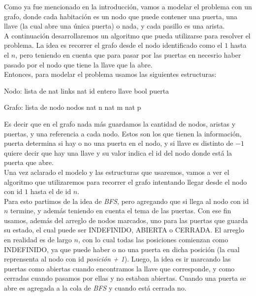 
Como ya fue mencionado en la introducción, vamos a modelar el problema con un grafo, donde cada habitación es un nodo que puede contener una puerta, una llave (la cual abre una única puerta) o nada, y cada pasillo es una arista. \\

A continuación desarrollaremos un algoritmo que pueda utilizarse para resolver el problema. La idea es recorrer el grafo desde el nodo identificado como el $1$ hasta el $n$, pero teniendo en cuenta que para pasar por las puertas en necesrio haber pasado por el nodo que tiene la llave que la abre. \\

Entonces, para modelar el problema usamos las siguientes estructuras:

\begin{verbatimtab}
Nodo:
	lista de nat links
	nat id
	entero llave
	bool puerta
\end{verbatimtab}

\begin{verbatimtab}
Grafo:
	lista de nodo nodos
	nat n
	nat m
	nat p
\end{verbatimtab}

Es decir que en el grafo nada más guardamos la cantidad de nodos, aristas y puertas, y una referencia a cada nodo. Estos son los que tienen la información, puerta determina si hay o no una puerta en el nodo, y si llave es distinto de $-1$ quiere decir que hay una llave y su valor indica el id del nodo donde está la puerta que abre. \\

Una vez aclarado el modelo y las estructuras que usaremos, vamos a ver el algoritmo que utilizaremos para recorrer el grafo intentando llegar desde el nodo con id $1$ hasta el de id $n$. \\

Para esto partimos de la idea de \textit{BFS}, pero agregando que si llega al nodo con id $n$ termine, y además teniendo en cuenta el tema de las puertas. Con ese fin usamos, además del arreglo de nodos marcados, uno para las puertas que guarda su estado, el cual puede ser INDEFINIDO, ABIERTA o CERRADA. El arreglo en realidad es de largo $n$, con lo cual todas las posiciones comienzan como INDEFINIDO, ya que puede haber o no una puerta en dicha posición (la cual reprensenta al nodo con id \textit{posición + 1}). Luego, la idea es ir marcando las puertas como abiertas cuando encontramos la llave que corresponde, y como cerradas cuando pasamos por ellas y no estaban abiertas. Cuando una puerta se abre es agregada a la cola de \textit{BFS} y cuando está cerrada no. \\

